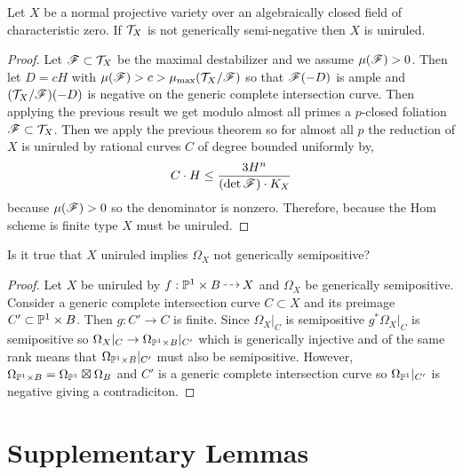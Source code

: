 \documentclass[12pt]{article}
\begin{document}
\begin{theorem}
Let $X$ be a normal projective variety over an algebraically closed field of characteristic zero. If $\T_X$ is not generically semi-negative then $X$ is uniruled.
\end{theorem}

\begin{proof}
Let $\F \subset \T_X$ be the maximal destabilizer and we assume $\mu(\F) > 0$. Then let $D = c H$ with $\mu(\F) > c > \mu_{\max}(\T_X/\F)$ so that $\F(-D)$ is ample and $(\T_X/\F)(-D)$ is negative on the generic complete intersection curve. Then applying the previous result we get modulo almost all primes a $p$-closed foliation $\F \subset \T_X$. Then we apply the previous theorem so for almost all $p$ the reduction of $X$ is uniruled by rational curves $C$ of degree bounded uniformly by,
\[ C \cdot H \le \frac{3 H^n}{(\det{\F}) \cdot K_X} \]
because $\mu(\F) > 0$ so the denominator is nonzero. Therefore, because the Hom scheme is finite type $X$ must be uniruled.
\end{proof}

{\color{red} Is it true that $X$ uniruled implies $\Omega_X$ not generically semipositive?}

\begin{proof}
Let $X$ be uniruled by $f : \P^1 \times B \rat X$ and $\Omega_X$ be generically semipositive. Consider a generic complete intersection curve $C \subset X$ and its preimage $C' \subset \P^1 \times B$. Then $g : C' \to C$ is finite. Since $\Omega_X |_C$ is semipositive $g^* \Omega_X|_C$ is semipositive so $\Omega_X|_C \to \Omega_{\P^1 \times B}|_{C'}$ which is generically injective and of the same rank means that $\Omega_{\P^1 \times B}|_{C'}$ must also be semipositive. However, $\Omega_{\P^1 \times B} = \Omega_{\P^1} \boxtimes \Omega_{B}$ and $C'$ is a generic complete intersection curve so $\Omega_{\P^1}|_{C'}$ is negative giving a contradiciton.
\end{proof}

\section{Supplementary Lemmas}

\newcommand{\Nef}{\mathrm{Nef}}
\newcommand{\Eff}{\mathrm{Eff}}
\newcommand{\NE}{\mathrm{NE}}
\end{document}
